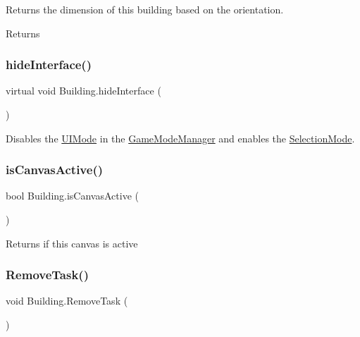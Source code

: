 Returns the dimension of this building based on the orientation. 

\begin{DoxyReturn}{Returns}

\end{DoxyReturn}
\mbox{\label{class_building_a29767cd7ca42694862d08cb4bd71154a}} 
\subsubsection{\texorpdfstring{hide\+Interface()}{hideInterface()}}
{\footnotesize\ttfamily virtual void Building.\+hide\+Interface (\begin{DoxyParamCaption}{ }\end{DoxyParamCaption})\hspace{0.3cm}{\ttfamily [virtual]}}



Disables the \mbox{\hyperlink{class_u_i_mode}{U\+I\+Mode}} in the \mbox{\hyperlink{class_game_mode_manager}{Game\+Mode\+Manager}} and enables the \mbox{\hyperlink{class_selection_mode}{Selection\+Mode}}. 

\mbox{\label{class_building_aba7c58665a626c146f2fc1e8b35cebb7}} 
\subsubsection{\texorpdfstring{is\+Canvas\+Active()}{isCanvasActive()}}
{\footnotesize\ttfamily bool Building.\+is\+Canvas\+Active (\begin{DoxyParamCaption}{ }\end{DoxyParamCaption})}



Returns if this canvas is active 

\mbox{\label{class_building_addab7076893886e5bf445ee317a81fb1}} 
\subsubsection{\texorpdfstring{Remove\+Task()}{RemoveTask()}}
{\footnotesize\ttfamily void Building.\+Remove\+Task (\begin{DoxyParamCaption}{ }\end{DoxyParamCaption})}



